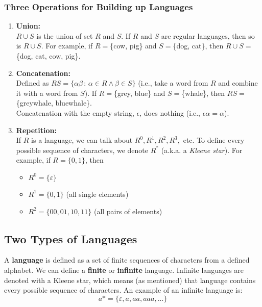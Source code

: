 \documentclass{report}
\begin{document}
\subsubsection{Three Operations for Building up Languages}
\begin{enumerate}
\item \textbf{Union:}\\
$R \cup S$ is the union of set $R$ and $S$. If $R$ and $S$ are regular languages, then so is $R \cup S$. For example, if $R = $\{cow, pig\} and $S = $\{dog, cat\}, then $R \cup S = $\{dog, cat, cow, pig\}.
\item \textbf{Concatenation:}\\
Defined as $RS = \{\alpha\beta \, : \, \alpha \in R \wedge \beta \in S\}$ (i.e., take a word from $R$ and combine it with a word from $S$). If $R = $\{grey, blue\} and $S = $\{whale\}, then $RS = $\{greywhale, bluewhale\}.\\
Concatenation with the empty string, $\epsilon$, does nothing (i.e., $\epsilon\alpha = \alpha$).
\item \textbf{Repetition:}\\
If $R$ is a language, we can talk about $R^0, R^1, R^2, R^3, $ etc. To define every possible sequence of characters, we denote $R^*$ (a.k.a. a \textit{Kleene star}). For example, if $R = \{0,1\}$, then
\begin{itemize}
\item $R^0 = \{\varepsilon\}$
\item $R^1 = \{0,1\}$ (all single elements)
\item $R^2 = \{00, 01, 10, 11\}$ (all pairs of elements)
\end{itemize}
\end{enumerate}
\subsection{Two Types of Languages}
A \textbf{language} is defined as a set of finite sequences of characters from a defined alphabet. We can define a \textbf{finite} or \textbf{infinite} language. Infinite languages are denoted with a Kleene star, which means (as mentioned) that language contains every possible sequence of characters. An example of an infinite language is:
$$a* = \{\varepsilon , a, aa, aaa, ...\}$$
\end{document}
